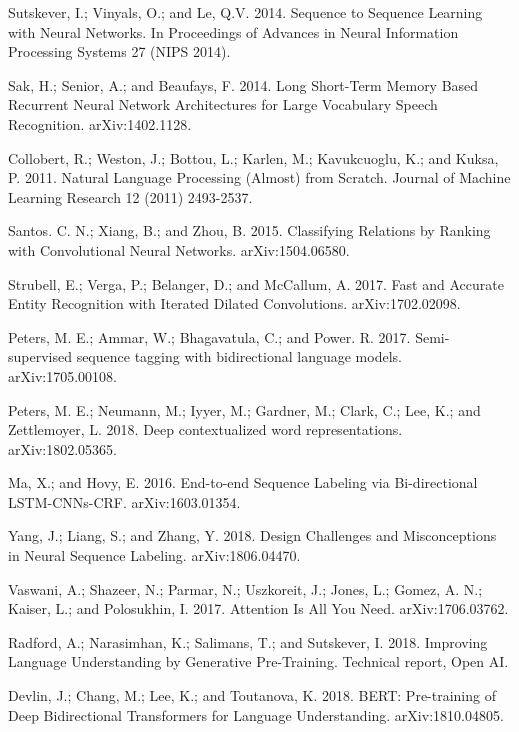 \documentclass[letterpaper]{article} %
\begin{document}
\smallskip \noindent
Sutskever, I.; Vinyals, O.; and Le, Q.V. 2014. Sequence to Sequence Learning with Neural Networks. In Proceedings of Advances in Neural Information Processing Systems 27 (NIPS 2014).

\smallskip \noindent
Sak, H.; Senior, A.; and Beaufays, F. 2014. Long Short-Term Memory Based Recurrent Neural Network Architectures for Large Vocabulary Speech Recognition. arXiv:1402.1128.

\smallskip \noindent 
Collobert, R.; Weston, J.; Bottou, L.; Karlen, M.; Kavukcuoglu, K.; and Kuksa, P. 2011. Natural Language Processing (Almost) from Scratch. Journal of Machine Learning Research 12 (2011) 2493-2537. 

\smallskip \noindent
Santos. C. N.; Xiang, B.; and Zhou, B. 2015. Classifying Relations by Ranking with Convolutional Neural Networks. arXiv:1504.06580. 

\smallskip \noindent
Strubell, E.; Verga, P.; Belanger, D.; and McCallum, A. 2017. Fast and Accurate Entity Recognition with Iterated Dilated Convolutions. arXiv:1702.02098. 

\smallskip \noindent
Peters, M. E.; Ammar, W.; Bhagavatula, C.; and Power. R.  2017. Semi-supervised sequence tagging with bidirectional language models. arXiv:1705.00108.

\smallskip \noindent 
Peters, M. E.; Neumann, M.; Iyyer, M.; Gardner, M.; Clark, C.; Lee, K.; and Zettlemoyer, L. 2018. Deep contextualized word representations. arXiv:1802.05365. 

\smallskip \noindent
Ma, X.; and Hovy, E. 2016. End-to-end Sequence Labeling via Bi-directional LSTM-CNNs-CRF. arXiv:1603.01354. 

\smallskip \noindent
Yang, J.; Liang, S.; and Zhang, Y. 2018. Design Challenges and Misconceptions in Neural Sequence Labeling. arXiv:1806.04470. 

\smallskip \noindent
Vaswani, A.; Shazeer, N.; Parmar, N.; Uszkoreit, J.; Jones, L.; Gomez, A. N.; Kaiser, L.; and Polosukhin, I. 2017. Attention Is All You Need. arXiv:1706.03762. 

\smallskip \noindent
Radford, A.; Narasimhan, K.; Salimans, T.; and Sutskever, I. 2018. Improving Language Understanding by Generative Pre-Training. Technical report, Open AI.

\smallskip \noindent
Devlin, J.; Chang, M.; Lee, K.; and Toutanova, K. 2018. BERT: Pre-training of Deep Bidirectional Transformers for Language Understanding. arXiv:1810.04805.
\end{document}
